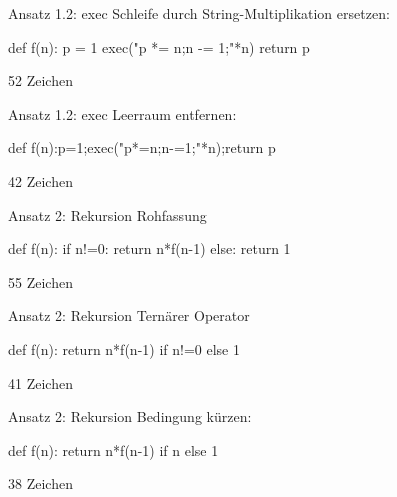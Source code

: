 \documentclass[xcolor=dvipsnames, aspectratio=43, 14pt]{beamer}
\begin{document}
\begin{frame}[fragile]{Ansatz 1.2: exec}
	Schleife durch String-Multiplikation ersetzen:
	
	\vfill
	
	\begin{python3code}
	def f(n):
	   p = 1
	   exec("p *= n;n -= 1;"*n)
	   return p
	\end{python3code}
	
	\vfill
	
	52 Zeichen
\end{frame}

\begin{frame}[fragile]{Ansatz 1.2: exec}
	Leerraum entfernen:
	
	\vfill
	
	\begin{python3code}
	def f(n):p=1;exec("p*=n;n-=1;"*n);return p
	\end{python3code}
	
	\vfill
	
	42 Zeichen
\end{frame}







\begin{frame}[fragile]{Ansatz 2: Rekursion}
	Rohfassung
	
	\vfill
	
	\begin{python3code}
	def f(n):
	   if n!=0:
	      return n*f(n-1)
	   else:
	      return 1
	\end{python3code}
	\vfill
	
	55 Zeichen
\end{frame}

\begin{frame}[fragile]{Ansatz 2: Rekursion}
	Ternärer Operator
	
	\vfill
	
	\begin{python3code}
	def f(n):
	   return n*f(n-1) if n!=0 else 1
	\end{python3code}
	\vfill
	
	41 Zeichen
\end{frame}

\begin{frame}[fragile]{Ansatz 2: Rekursion}
	Bedingung kürzen:
	
	\vfill
	
	\begin{python3code}
	def f(n):
	   return n*f(n-1) if n else 1
	\end{python3code}
	\vfill
	
	38 Zeichen
\end{frame}
\end{document}
